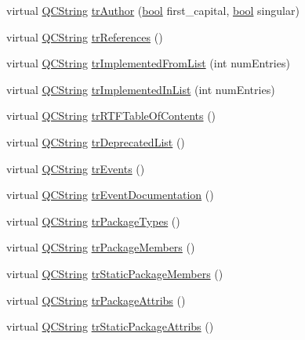 \begin{DoxyCompactItemize}
\item 
virtual \hyperlink{class_q_c_string}{Q\+C\+String} \hyperlink{class_translator_dutch_a12714f2eb503c562abbfa75864801fc2}{tr\+Author} (\hyperlink{qglobal_8h_a1062901a7428fdd9c7f180f5e01ea056}{bool} first\+\_\+capital, \hyperlink{qglobal_8h_a1062901a7428fdd9c7f180f5e01ea056}{bool} singular)
\item 
virtual \hyperlink{class_q_c_string}{Q\+C\+String} \hyperlink{class_translator_dutch_a5f3c8f9bee79ac5046cb7841378c3d84}{tr\+References} ()
\item 
virtual \hyperlink{class_q_c_string}{Q\+C\+String} \hyperlink{class_translator_dutch_ad4a24b2a365f4f1dcb14bf46eee42cef}{tr\+Implemented\+From\+List} (int num\+Entries)
\item 
virtual \hyperlink{class_q_c_string}{Q\+C\+String} \hyperlink{class_translator_dutch_a9415e39c60e6c4055e832e33894dff67}{tr\+Implemented\+In\+List} (int num\+Entries)
\item 
virtual \hyperlink{class_q_c_string}{Q\+C\+String} \hyperlink{class_translator_dutch_aa71cf5cbac07d56330cfda9477986d44}{tr\+R\+T\+F\+Table\+Of\+Contents} ()
\item 
virtual \hyperlink{class_q_c_string}{Q\+C\+String} \hyperlink{class_translator_dutch_a9dfeab077b7d62a76044567940295a9d}{tr\+Deprecated\+List} ()
\item 
virtual \hyperlink{class_q_c_string}{Q\+C\+String} \hyperlink{class_translator_dutch_a8b353e3faef70a92c08a0ffaa64aaf8e}{tr\+Events} ()
\item 
virtual \hyperlink{class_q_c_string}{Q\+C\+String} \hyperlink{class_translator_dutch_a2a1390c102e41e741718f917eea9b707}{tr\+Event\+Documentation} ()
\item 
virtual \hyperlink{class_q_c_string}{Q\+C\+String} \hyperlink{class_translator_dutch_ae69b64135bf5821b2835069349077c06}{tr\+Package\+Types} ()
\item 
virtual \hyperlink{class_q_c_string}{Q\+C\+String} \hyperlink{class_translator_dutch_a39ecb988a8180c47c0c045c1bf19950d}{tr\+Package\+Members} ()
\item 
virtual \hyperlink{class_q_c_string}{Q\+C\+String} \hyperlink{class_translator_dutch_a2a3387dc165af561aefef83e0f5b3d4d}{tr\+Static\+Package\+Members} ()
\item 
virtual \hyperlink{class_q_c_string}{Q\+C\+String} \hyperlink{class_translator_dutch_a4543f1dd54c990d6977aa26cfc247c8b}{tr\+Package\+Attribs} ()
\item 
virtual \hyperlink{class_q_c_string}{Q\+C\+String} \hyperlink{class_translator_dutch_acff571f657256c68acf341b3f0719959}{tr\+Static\+Package\+Attribs} ()

\end{DoxyCompactItemize}
